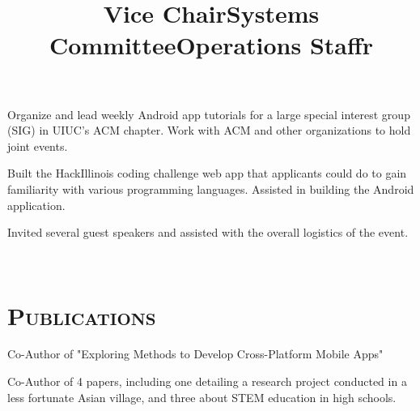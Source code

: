 \begin{resume}
\title{Vice Chair}
\begin{position}
Organize and lead weekly Android app tutorials for a large special interest group (SIG) in UIUC's ACM chapter. Work with ACM and other organizations to hold joint events.
\end{position}

\title{Systems Committee}
\begin{position}
Built the HackIllinois coding challenge web app that applicants could do to gain familiarity with various programming languages. Assisted in building the Android application.
\end{position}

\title{Operations Staff}
\begin{position}
Invited several guest speakers and assisted with the overall logistics of the event.
\end{position}

\begin{formatb}
  \title{r}\\
\end{formatb}

\section{\textsc{Publications}}

\title{}
\begin{position}
Co-Author of "Exploring Methods to Develop Cross-Platform Mobile Apps"
\end{position}

\title{}
\begin{position}
Co-Author of 4 papers, including one detailing a research project conducted in a less fortunate Asian village, and three about STEM education in high schools.
\end{position}

\end{resume}

